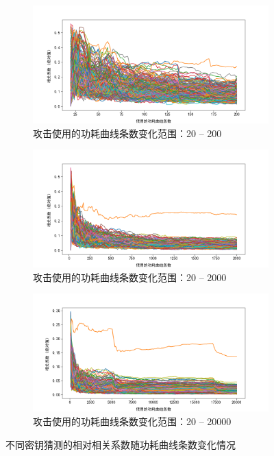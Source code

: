 \begin{figure}[htbp]
    \centering

    \begin{subfigure}{1.0\textwidth}
        \includegraphics[height=.25\textheight, width=1.0\textwidth]{../images/keyrank_200_2.png}
        \caption{攻击使用的功耗曲线条数变化范围：20 -- 200}
    \end{subfigure}

    \begin{subfigure}{1.0\textwidth}
        \includegraphics[height=.25\textheight, width=1.0\textwidth]{../images/keyrank_2000_10.png}
        \caption{攻击使用的功耗曲线条数变化范围：20 -- 2000}
        \label{fig:keyrank_2000}
    \end{subfigure}

    \begin{subfigure}{1.0\textwidth}
        \includegraphics[height=.25\textheight, width=1.0\textwidth]{../images/keyrank_20000_100.png}
        \caption{攻击使用的功耗曲线条数变化范围：20 -- 20000}
        \label{fig:keyrank_20000}
    \end{subfigure}

    \caption{不同密钥猜测的相对相关系数随功耗曲线条数变化情况}
    \label{fig:keyrank}
\end{figure}

